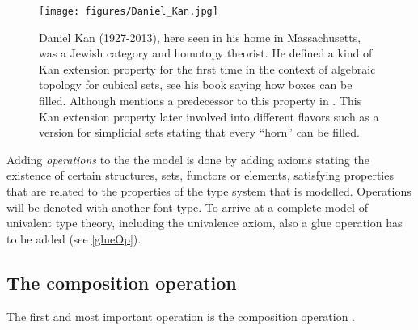 \documentclass[12pt,a4paper,twoside,xetex]{book}
\newcommand{\keyword}[1]{\emph{#1}\index{#1}}
\begin{document}
\begin{figure}
\begin{centering}
\texttt{[image: figures/Daniel\_Kan.jpg]}
\par\end{centering}
\caption{\label{fig:Kan}Daniel Kan (1927-2013), here seen in his home in 
Massachusetts, was a Jewish category and homotopy theorist. He defined  a kind 
of Kan extension property for the first time in the context of algebraic 
topology for cubical sets, see his book \cite{Kan1955} saying how boxes can be 
filled. Although \cite{Coquand2019} mentions a predecessor to this property in 
\cite{Eilenberg1939}. This Kan extension property later involved into different 
flavors such as a version for simplicial sets stating that every ``horn'' can 
be filled.}
\end{figure}

Adding \keyword{operations} to the the model is done by adding axioms stating 
the existence of certain structures, sets, functors or elements, satisfying 
properties that are related to the properties of the type system that is 
modelled. Operations will be denoted with another font type. To arrive at a 
complete model of univalent type theory, including the univalence axiom, also a 
glue operation has to be added (see \cref{glueOp}). 

\subsection{The composition operation}

The first and most important operation is the composition operation 
\cite{Orton2019}. 
\end{document}
